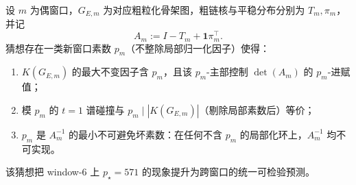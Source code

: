 \begin{conjecture}\label{conj:conclusion-tree-torsion-spectral-collision-green-bad-prime-rigidity}
设 \(m\) 为偶窗口，\(G_{E,m}\) 为对应粗粒化骨架图，粗链核与平稳分布分别为 \(T_m,\pi_m\)，并记
\[
A_m:=I-T_m+\mathbf 1\pi_m^{\!\top}.
\]
猜想存在一类新窗口素数 \(p_m\)（不整除局部归一化因子）使得：
\begin{enumerate}
  \item \(K(G_{E,m})\) 的最大不变因子含 \(p_m\)，且该 \(p_m\)-主部控制 \(\det(A_m)\) 的 \(p_m\)-进赋值；
  \item 模 \(p_m\) 的 \(t=1\) 谱碰撞与 \(p_m\mid |K(G_{E,m})|\)（剔除局部素数后）等价；
  \item \(p_m\) 是 \(A_m^{-1}\) 的最小不可避免坏素数：在任何不含 \(p_m\) 的局部化环上，\(A_m^{-1}\) 均不可实现。
\end{enumerate}
该猜想把 window-\(6\) 上 \(p_\star=571\) 的现象提升为跨窗口的统一可检验预测。
\end{conjecture}

\endinput
